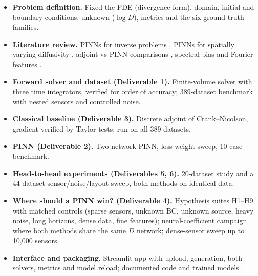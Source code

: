 \documentclass[twoside,english]{article}
\begin{document}
\begin{itemize}
\item \textbf{Problem definition.} Fixed the PDE (divergence form), domain, initial and boundary conditions, unknown ($\log D$), metrics and the six ground-truth families.
\item \textbf{Literature review.} PINNs for inverse problems \citep{raissi2019}, PINNs for spatially varying diffusivity \citep{thakur2024}, adjoint vs PINN comparisons \citep{zhang2026}, spectral bias and Fourier features \citep{rahaman2019,tancik2020}.
\item \textbf{Forward solver and dataset (Deliverable 1).} Finite-volume solver with three time integrators, verified for order of accuracy; 389-dataset benchmark with nested sensors and controlled noise.
\item \textbf{Classical baseline (Deliverable 3).} Discrete adjoint of Crank--Nicolson, gradient verified by Taylor tests; run on all 389 datasets.
\item \textbf{PINN (Deliverable 2).} Two-network PINN, loss-weight sweep, 10-case benchmark.
\item \textbf{Head-to-head experiments (Deliverables 5, 6).} 20-dataset study and a 44-dataset sensor/noise/layout sweep, both methods on identical data.
\item \textbf{Where should a PINN win? (Deliverable 4).} Hypothesis suites H1--H9 with matched controls (sparse sensors, unknown BC, unknown source, heavy noise, long horizons, dense data, fine features); neural-coefficient campaign where both methods share the same $D$ network; dense-sensor sweep up to 10{,}000 sensors.
\item \textbf{Interface and packaging.} Streamlit app with upload, generation, both solvers, metrics and model reload; documented code and trained models.
\end{itemize}
\end{document}
